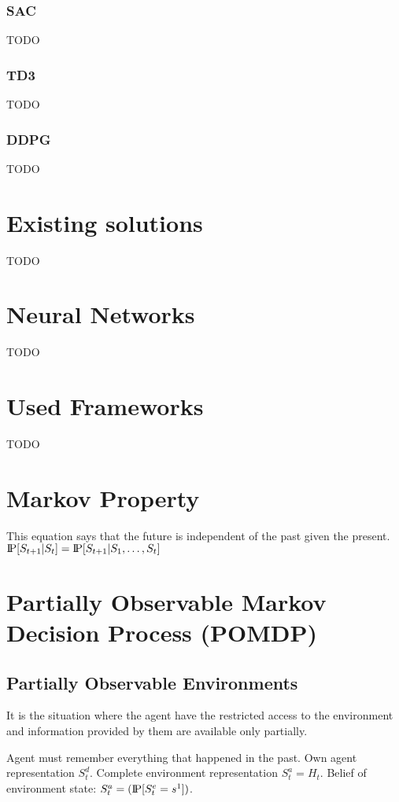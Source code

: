 \subsubsection{SAC}
TODO

\subsubsection{TD3}
TODO

\subsubsection{DDPG}
TODO


\section{Existing solutions}\label{sec:existing-solutions}
TODO


\section{Neural Networks}\label{sec:neural-networks}
TODO


\section{Used Frameworks}\label{sec:used-frameworks}
TODO


\section{Markov Property}
This equation says that the future is independent of the past given the present.
$\text{I\kern-0.15em P}[S_{t+1}|S_t] = \text{I\kern-0.15em P}[S_{t+1}|S_1,\ldots,S_t]$


\section{Partially Observable Markov Decision Process (POMDP)}

\subsection{Partially Observable Environments}
It is the situation where the agent have the restricted access to the environment
and information provided by them are available only partially.

Agent must remember everything that happened in the past.
Own agent representation $S_t^d$.
Complete environment representation $S_t^a=H_t$.
Belief of environment state: $S_t^a=(\text{I\kern-0.15em P}[S_t^e=s^1])$.


